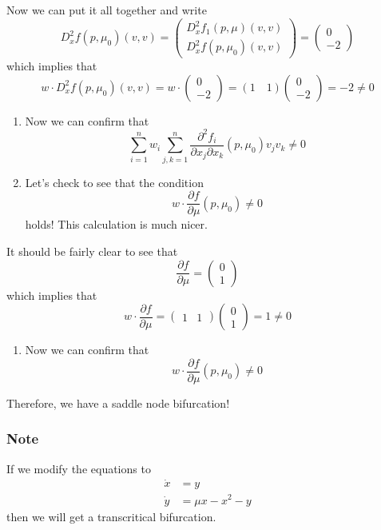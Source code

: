 \documentclass{article}
\begin{document}
Now we can put it all together and write
\[
D^2_x f(p,\mu_0)(v,v) = \begin{pmatrix}
    D_x^2 f_1(p, \mu)(v, v) \\ D^2_x f(p,\mu_0)(v,v)
\end{pmatrix} = \begin{pmatrix}
    0 \\ -2
\end{pmatrix}
\]
which implies that
\[
w\cdot D^2_x f(p,\mu_0)(v,v)=w \cdot\begin{pmatrix} 0 \\ -2 \end{pmatrix}= (1 \quad 1)\begin{pmatrix} 0 \\ -2 \end{pmatrix}= -2 \neq 0
\]

\begin{enumerate}
    \item[2.] Now we can confirm that \[\sum^n_{i=1}w_i\sum_{j,k=1}^{n}\frac{\partial^2 f_i}{\partial x_j \partial x_k}(p,\mu_0)v_j v_k\neq 0\]
    \item[3.] Let's check to see that the condition \[w\cdot\frac{\partial f}{\partial \mu}(p,\mu_0)\neq0\] holds! This calculation is much nicer.
\end{enumerate}
It should be fairly clear to see that
\[
\frac{\partial f}{\partial \mu} = \begin{pmatrix}
    0\\1
\end{pmatrix}\]
which implies that
\[w\cdot \frac{\partial f}{\partial \mu}= \begin{pmatrix}
    1 & 1
\end{pmatrix}\begin{pmatrix}
    0\\1
\end{pmatrix}=1\neq 0
\]
\begin{enumerate}
    \item[3.] Now we can confirm that \[w\cdot\frac{\partial f}{\partial \mu}(p,\mu_0)\neq0\]
\end{enumerate}
Therefore, we have a saddle node bifurcation!

\subsubsection{Note}
If we modify the equations to 
\begin{align*}
    \dot{x}&= y\\
    \dot{y}&= \mu x -x^2 - y
\end{align*}
then we will get a transcritical bifurcation.
\end{document}
